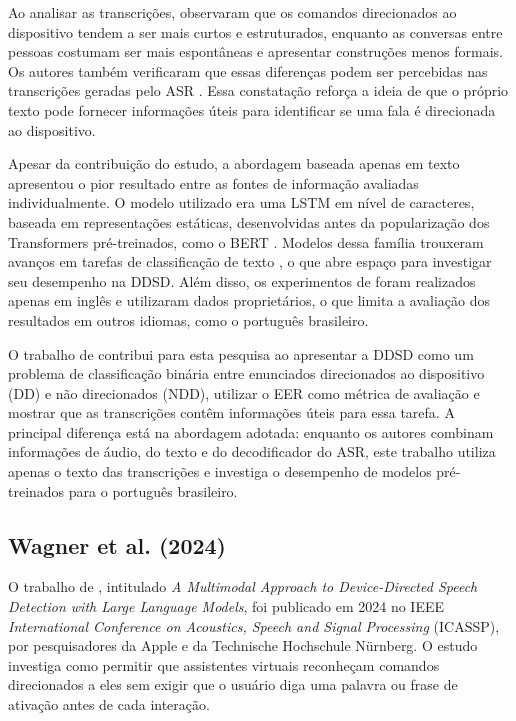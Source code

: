 \documentclass[
    12pt,                %
    openright,           %
    oneside,             %
    a4paper,             %
    english,             %
    brazil               %
]{abntex2}
\begin{document}
Ao analisar as transcrições,  observaram que os comandos direcionados ao dispositivo tendem a ser mais curtos e estruturados, enquanto as conversas entre pessoas costumam ser mais espontâneas e apresentar construções menos formais. Os autores também verificaram que essas diferenças podem ser percebidas nas transcrições geradas pelo ASR \cite{Mallidi2018}. Essa constatação reforça a ideia de que o próprio texto pode fornecer informações úteis para identificar se uma fala é direcionada ao dispositivo.

Apesar da contribuição do estudo, a abordagem baseada apenas em texto apresentou o pior resultado entre as fontes de informação avaliadas individualmente. O modelo utilizado era uma LSTM em nível de caracteres, baseada em representações estáticas, desenvolvidas antes da popularização dos Transformers pré-treinados, como o BERT \cite{Devlin2019}. Modelos dessa família trouxeram avanços em tarefas de classificação de texto \cite{Weld2023}, o que abre espaço para investigar seu desempenho na DDSD. Além disso, os experimentos de  foram realizados apenas em inglês e utilizaram dados proprietários, o que limita a avaliação dos resultados em outros idiomas, como o português brasileiro.

O trabalho de  contribui para esta pesquisa ao apresentar a DDSD como um problema de classificação binária entre enunciados direcionados ao dispositivo (DD) e não direcionados (NDD), utilizar o EER como métrica de avaliação e mostrar que as transcrições contêm informações úteis para essa tarefa. A principal diferença está na abordagem adotada: enquanto os autores combinam informações de áudio, do texto e do decodificador do ASR, este trabalho utiliza apenas o texto das transcrições e investiga o desempenho de modelos pré-treinados para o português brasileiro.


\subsection{Wagner et al. (2024)}

O trabalho de , intitulado \textit{A Multimodal Approach to Device-Directed Speech Detection with Large Language Models}, foi publicado em 2024 no IEEE \textit{International Conference on Acoustics, Speech and Signal Processing} (ICASSP), por pesquisadores da Apple e da Technische Hochschule Nürnberg. O estudo investiga como permitir que assistentes virtuais reconheçam comandos direcionados a eles sem exigir que o usuário diga uma palavra ou frase de ativação antes de cada interação.
\end{document}
